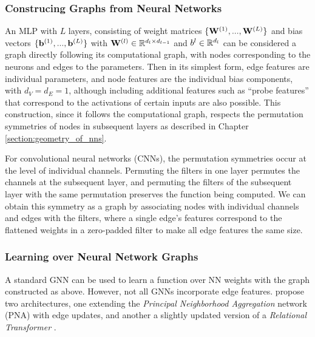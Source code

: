 \subsubsection{Construcing Graphs from Neural Networks}

An MLP with $L$ layers, consisting of weight matrices $\{ \mathbf{W}^{(1)},...,\mathbf{W}^{(L)} \}$ and bias vectors $\{ \mathbf{b}^{(1)},...,\mathbf{b}^{(L)}\}$ with $\mathbf{W}^{(l)} \in \mathbb{R}^{d_l \times d_{l-1}}$ and $b^{l}\in \mathbb{R}^{d_l}$ can be considered a graph directly following its computational graph, with nodes corresponding to the neurons and edges to the parameters. Then in its simplest form, edge features are individual parameters, and node features are the individual bias components, with $d_V = d_E = 1$, although including additional features such as ``probe features'' that correspond to the activations of certain inputs are also possible. This construction, since it follows the computational graph, respects the permutation symmetries of nodes in subsequent layers as described in Chapter \ref{section:geometry_of_nns}.

For convolutional neural networks (CNNs), the permutation symmetries occur at the level of individual channels. Permuting the filters in one layer permutes the channels at the subsequent layer, and permuting the filters of the subsequent layer with the same permutation preserves the function being computed. We can obtain this symmetry as a graph by associating nodes with individual channels and edges with the filters, where a single edge's features correspond to the flattened weights in a zero-padded filter to make all edge features the same size. 

\subsubsection{Learning over Neural Network Graphs} \label{sec:learning_graphs}

A standard GNN can be used to learn a function over NN weights with the graph constructed as above. However, not all GNNs incorporate edge features. \citet{kofinasGraphNeuralNetworks2024} propose two architectures, one extending the \textit{Principal Neighborhood Aggregation} network (PNA) \citep{corsoPrincipalNeighbourhoodAggregation2020} with edge updates, and another a slightly updated version of a \textit{Relational Transformer} \citep{diaoRelationalAttentionGeneralizing2023}. 

